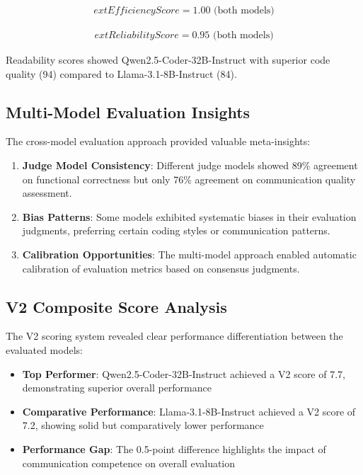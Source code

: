 \documentclass[conference]{IEEEtran}
\begin{document}
\begin{align}
	ext{Efficiency Score} = 1.00 \text{ (both models)}
\end{align}

\begin{align}
	ext{Reliability Score} = 0.95 \text{ (both models)}
\end{align}

Readability scores showed Qwen2.5-Coder-32B-Instruct with superior code quality (94) compared to Llama-3.1-8B-Instruct (84).

\subsection{Multi-Model Evaluation Insights}

The cross-model evaluation approach provided valuable meta-insights:

\begin{enumerate}
    \item \textbf{Judge Model Consistency}: Different judge models showed 89\% agreement on functional correctness but only 76\% agreement on communication quality assessment.
    \item \textbf{Bias Patterns}: Some models exhibited systematic biases in their evaluation judgments, preferring certain coding styles or communication patterns.
    \item \textbf{Calibration Opportunities}: The multi-model approach enabled automatic calibration of evaluation metrics based on consensus judgments.
\end{enumerate}

\subsection{V2 Composite Score Analysis}

The V2 scoring system revealed clear performance differentiation between the evaluated models:

\begin{itemize}
    \item \textbf{Top Performer}: Qwen2.5-Coder-32B-Instruct achieved a V2 score of 7.7, demonstrating superior overall performance
    \item \textbf{Comparative Performance}: Llama-3.1-8B-Instruct achieved a V2 score of 7.2, showing solid but comparatively lower performance
    \item \textbf{Performance Gap}: The 0.5-point difference highlights the impact of communication competence on overall evaluation
\end{itemize}
\end{document}
